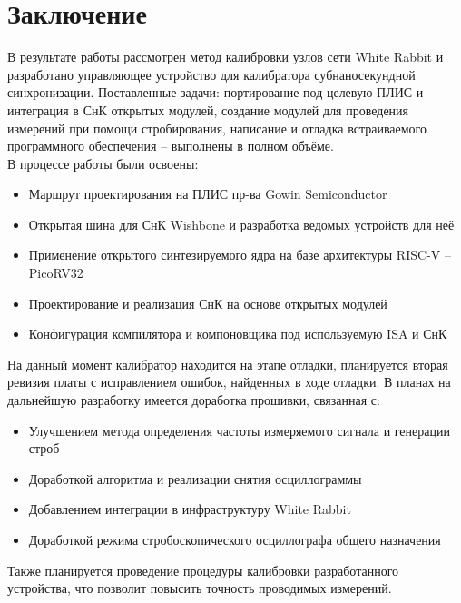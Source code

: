 \chapter*{Заключение} \label{ch-conclusion}

В результате работы рассмотрен метод калибровки узлов сети White Rabbit и 
разработано управляющее устройство для калибратора субнаносекундной синхронизации.
Поставленные задачи: портирование под целевую ПЛИС и интеграция в СнК открытых модулей, создание
модулей для проведения измерений при помощи стробирования, написание и отладка встраиваемого программного обеспечения -- выполнены в полном объёме.\\

\noindent В процессе работы были освоены:
\begin{itemize}
	\item Маршрут проектирования на ПЛИС пр-ва Gowin Semiconductor
	\item Открытая шина для СнК Wishbone и разработка ведомых устройств для неё
	\item Применение открытого синтезируемого ядра на базе архитектуры RISC-V -- PicoRV32
	\item Проектирование и реализация СнК на основе открытых модулей
	\item Конфигурация компилятора и компоновщика под используемую ISA и СнК\\
\end{itemize}

На данный момент калибратор находится на этапе отладки, планируется вторая ревизия платы с исправлением ошибок, найденных в ходе отладки.
В планах на дальнейшую разработку имеется доработка прошивки, связанная с:
\begin{itemize}
	\item Улучшением метода определения частоты измеряемого сигнала и генерации строб
	\item Доработкой алгоритма и реализации снятия осциллограммы
	\item Добавлением интеграции в инфраструктуру White Rabbit
	\item Доработкой режима стробоскопического осциллографа общего назначения\\
\end{itemize}

Также планируется проведение процедуры калибровки разработанного устройства, что позволит повысить точность проводимых измерений.

